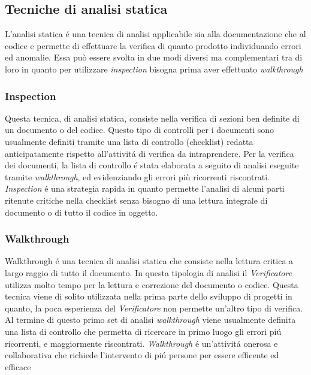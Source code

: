 \subsection{Tecniche di analisi statica}
L'analisi statica \'e una tecnica di analisi applicabile sia alla documentazione che al codice e permette di effettuare la verifica di quanto prodotto individuando errori ed anomalie. Essa può essere svolta in due modi diversi ma complementari tra di loro in quanto per utilizzare \textit{inspection} bisogna prima aver effettuato \textit{walkthrough}
\subsubsection{Inspection}
Questa tecnica, di analisi statica, consiste nella verifica di sezioni ben definite di un documento o del codice. Questo tipo di controlli per i documenti sono usualmente definiti tramite una lista di controllo (checklist) redatta anticipatamente rispetto all'attivit\'a di verifica da intraprendere. Per la verifica dei documenti, la lista di controllo \'e stata elaborata a seguito di analisi eseguite tramite \textit{walkthrough}, ed evidenziando gli errori più ricorrenti riscontrati. \textit{Inspection} \'e una strategia rapida in quanto permette l'analisi di alcuni parti ritenute critiche nella checklist senza bisogno di una lettura integrale di documento o di tutto il codice in oggetto.
\subsubsection{Walkthrough}
Walkthrough \'e una tecnica di analisi statica che consiste nella lettura critica a largo raggio di tutto il documento. In questa tipologia di analisi il \textit{Verificatore} utilizza molto tempo per la lettura e correzione del documento o codice. Questa tecnica viene di solito utilizzata nella prima parte dello sviluppo di progetti in quanto, la poca esperienza del \textit{Verificatore} non permette un'altro tipo di verifica. Al termine di questo primo set di analisi \textit{walkthrough} viene usualmente definita una lista di controllo che permetta di ricercare in primo luogo gli errori pi\'u ricorrenti, e maggiormente riscontrati. \textit{Walkthrough} \'e un'attivit\'a onerosa e collaborativa che richiede l'intervento di pi\'u persone per essere efficente ed efficace
